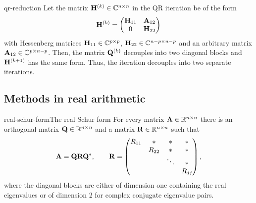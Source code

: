\begin{Theorem}{qr-reduction}
  Let the matrix $\mathbf H^{(k)}\in\mathbb C^{n\times n}$ in the QR iteration be of the
  form
  \begin{gather}
    \mathbf H^{(k)} =
    \begin{pmatrix}
      \mathbf H_{11} & \mathbf A_{12}\\0 & \mathbf H_{22}
    \end{pmatrix}
  \end{gather}
  with Hessenberg matrices $\mathbf H_{11}\in\mathbb C^{p\times p}$,
  $\mathbf H_{22}\in \mathbb C^{n-p\times n-p}$ and an arbitrary matrix
  $\mathbf A_{12}\in \mathbb C^{p\times n-p}$. Then, the matrix $\mathbf Q^{(k)}$
  decouples into two diagonal blocks and $\mathbf H^{(k+1)}$ has the same
  form. Thus, the iteration decouples into two separate iterations.
\end{Theorem}




\subsection{Methods in real arithmetic}

\begin{Theorem*}{real-schur-form}{The real Schur form}
  For every matrix $\mathbf A\in \mathbb R^{n\times n}$ there is an orthogonal matrix
  $\mathbf Q\in\mathbb R^{n\times n}$ and a matrix $\mathbf R\in\mathbb R^{n\times n}$ such that
  \begin{gather}
    \mathbf A = \mathbf Q\mathbf R\mathbf Q^*,
    \qquad
    \mathbf R =
    \begin{pmatrix}
      R_{11} &* & *&*\\
      &R_{22}&*&*\\
      &&\ddots&*\\
      &&& R_{jj}
    \end{pmatrix},
  \end{gather}
  where the diagonal blocks are either of dimension one containing the
  real eigenvalues or of dimension 2 for complex conjugate eigenvalue
  pairs.
\end{Theorem*}


